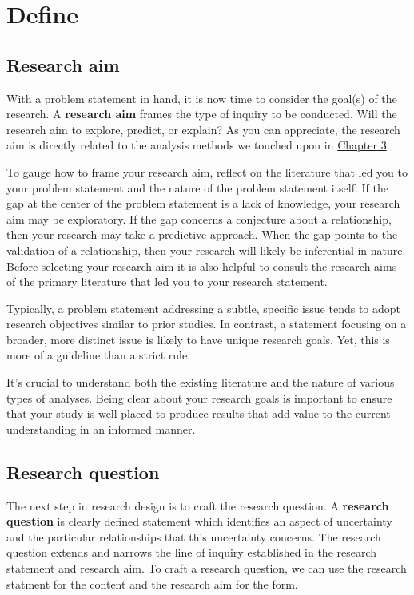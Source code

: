 \documentclass[
  letterpaper,
  krantz1]{latex/krantz-mod}
\theoremstyle{definition}
\theoremstyle{definition}
\theoremstyle{remark}
\begin{document}
\section{Define}\label{sec-research-define}

\subsection{Research aim}\label{sec-research-aim}

With a problem statement in hand, it is now time to consider the goal(s)
of the research. A \textbf{research aim} frames the type of inquiry to
be conducted. Will the research aim to explore, predict, or explain? As
you can appreciate, the research aim is directly related to the analysis
methods we touched upon in \hyperref[sec-approaching-analysis]{Chapter
3}.

To gauge how to frame your research aim, reflect on the literature that
led you to your problem statement and the nature of the problem
statement itself. If the gap at the center of the problem statement is a
lack of knowledge, your research aim may be exploratory. If the gap
concerns a conjecture about a relationship, then your research may take
a predictive approach. When the gap points to the validation of a
relationship, then your research will likely be inferential in nature.
Before selecting your research aim it is also helpful to consult the
research aims of the primary literature that led you to your research
statement.

Typically, a problem statement addressing a subtle, specific issue tends
to adopt research objectives similar to prior studies. In contrast, a
statement focusing on a broader, more distinct issue is likely to have
unique research goals. Yet, this is more of a guideline than a strict
rule.

It's crucial to understand both the existing literature and the nature
of various types of analyses. Being clear about your research goals is
important to ensure that your study is well-placed to produce results
that add value to the current understanding in an informed manner.

\subsection{Research question}\label{sec-research-question}

The next step in research design is to craft the research question. A
\textbf{research question} is clearly defined
statement which identifies an aspect of uncertainty and the particular
relationships that this uncertainty concerns. The research question
extends and narrows the line of inquiry established in the research
statement and research aim. To craft a research question, we can use the
research statment for the content and the research aim for the form.
\end{document}
